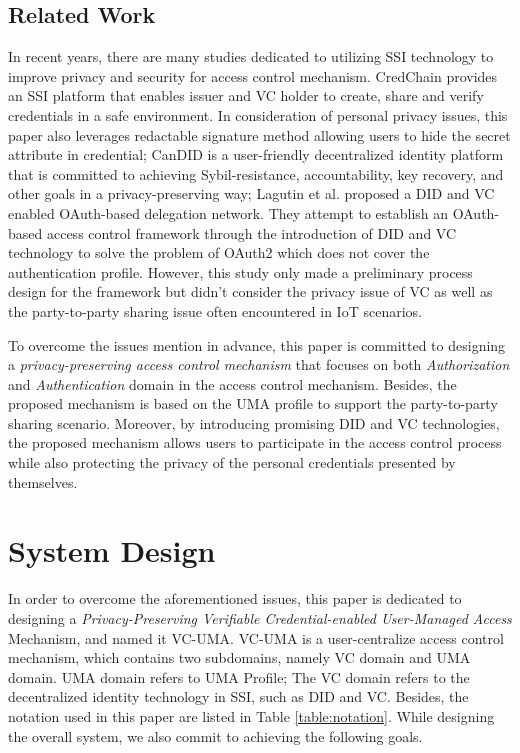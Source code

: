 \documentclass[conference, dvipdfmx]{IEEEtran} %
\begin{document}
\begin{sloppypar}
\subsection{Related Work}
In recent years, there are many studies dedicated to utilizing SSI technology to improve privacy and security for access control mechanism. CredChain\cite{Selective_Disclosure_paper} provides an SSI platform that enables issuer and VC holder to create, share and verify credentials in a safe environment. In consideration of personal privacy issues, this paper also leverages redactable signature\cite{redactable_signature} method allowing users to hide the secret attribute in credential; CanDID\cite{CanDID} is a user-friendly decentralized identity platform that is committed to achieving Sybil-resistance, accountability, key recovery, and other goals in a privacy-preserving way; Lagutin et al.\cite{VC_Oauth} proposed a DID and VC enabled OAuth-based delegation network. They attempt to establish an OAuth-based access control framework through the introduction of DID and VC technology to solve the problem of OAuth2 which does not cover the authentication profile.  However, this study only made a preliminary process design for the framework but didn't consider the privacy issue of VC as well as the party-to-party sharing issue often encountered in IoT scenarios.

To overcome the issues mention in advance, this paper is committed to designing a \textit{privacy-preserving access control mechanism} that focuses on both \textit{Authorization} and \textit{Authentication} domain in the access control mechanism. Besides, the proposed mechanism is based on the UMA profile to support the party-to-party sharing scenario. Moreover, by introducing promising DID and VC technologies, the proposed mechanism allows users to participate in the access control process while also protecting the privacy of the personal credentials presented by themselves.

\section{System Design}
\label{sec:system_design}

In order to overcome the aforementioned issues, this paper is dedicated to designing a \textit{Privacy-Preserving Verifiable Credential-enabled User-Managed Access} Mechanism, and named it VC-UMA. VC-UMA is a user-centralize access control mechanism, which contains two subdomains, namely VC domain and UMA domain. UMA domain refers to UMA Profile\cite{UMA}; The VC domain refers to the decentralized identity technology in SSI, such as DID and VC. Besides, the notation used in this paper are listed in Table \ref{table:notation}. 
While designing the overall system, we also commit to achieving the following goals.


\end{sloppypar}
\end{document}
